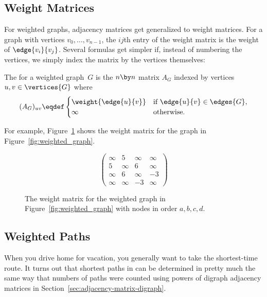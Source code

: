 \subsection{Weight Matrices}

\iffalse
  \textcolor{red}{replaced by ARM with the next paragraph}: There are many
  ways to represent a graph.  We have already seen two ways: you can draw
  it, as in Figure~\ref{fig:weighted_graph} for example, or you can
  represent it with sets of vertices and edges.  Another common
  representation is with an adjacency matrix.
\fi

For weighted graphs, adjacency matrices get generalized to weight
matrices.  For a graph with vertices $v_0,\dots,v_{n-1}$, the $ij$th
entry of the weight matrix is the weight of $\edge{v_i}{v_j}$.
Several formulas get simpler if, instead of numbering the vertices, we
simply index the matrix by the vertices themselves:
\begin{definition}\label{def:weighted_adjacency_matrix}
The  for a weighted graph~$G$
is the $n \by n$ matrix $A_G$ indexed by vertices $u,v \in \vertices{G}$ where
\[
  (A_G)_{uv} \eqdef \begin{cases}
                \weight{\edge{u}{v}} & \text{if $\edge{u}{v} \in \edges{G}$}, \\
                \infty         & \text{otherwise.}
              \end{cases}
\]
\end{definition}

For example, Figure~\ref{fig:adjacency_matrix} shows the weight matrix
for the graph in Figure~\ref{fig:weighted_graph}.

\begin{figure}\redrawntrue
\[
 \begin{pmatrix}
\infty & 5 & \infty & \infty \\
5 & \infty & 6 & \infty \\
\infty & 6 & \infty & -3 \\
\infty & \infty & -3 & \infty
       \end{pmatrix}
\]

\caption{The weight matrix for the weighted graph in
  Figure~\ref{fig:weighted_graph} with nodes in order $a,b,c,d$.}
\label{fig:adjacency_matrix}
\end{figure}

\subsection{Weighted Paths}
When you drive home for vacation, you generally want to take the
shortest-time route.  It turns out that shortest paths in can be
determined in pretty much the same way that numbers of paths were
counted using powers of digraph adjacency matrices in
Section~\ref{sec:adjacency-matrix-digraph}.

